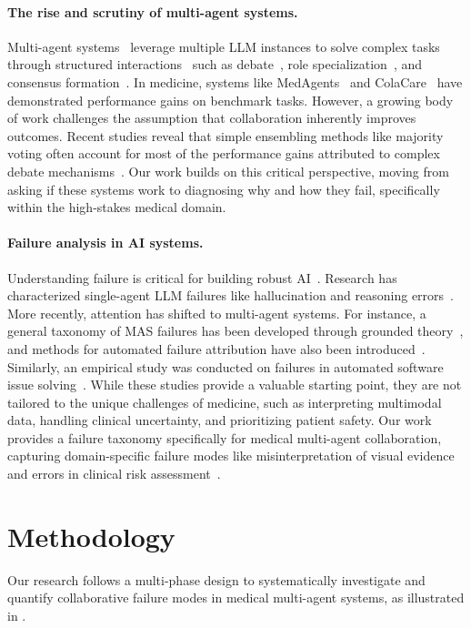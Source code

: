 \documentclass{article}
\begin{document}
\paragraph{The rise and scrutiny of multi-agent systems.}
Multi-agent systems~\cite{kim2024health} leverage multiple LLM instances to solve complex tasks through structured interactions~\cite{tran2025mas_survey} such as debate~\cite{du2023improving,hong2024metagpt}, role specialization~\cite{tang2024medagents}, and consensus formation~\cite{chen2024reconcile}. In medicine, systems like MedAgents~\cite{tang2024medagents} and ColaCare~\cite{wang2025colacare} have demonstrated performance gains on benchmark tasks. However, a growing body of work challenges the assumption that collaboration inherently improves outcomes. Recent studies reveal that simple ensembling methods like majority voting often account for most of the performance gains attributed to complex debate mechanisms~\cite{choi2025debate, kaesberg2025voting, liang2023encouraging}. Our work builds on this critical perspective, moving from asking if these systems work to diagnosing why and how they fail, specifically within the high-stakes medical domain.

\paragraph{Failure analysis in AI systems.}
Understanding failure is critical for building robust AI~\cite{arrieta2020explainable}. Research has characterized single-agent LLM failures like hallucination and reasoning errors~\cite{qiu2025quantifying,huang2025survey}. More recently, attention has shifted to multi-agent systems. For instance, a general taxonomy of MAS failures has been developed through grounded theory~\cite{pan2025multiagent}, and methods for automated failure attribution have also been introduced~\cite{zhang2025which}. Similarly, an empirical study was conducted on failures in automated software issue solving~\cite{liu2025empirical, cemri2025multi}. While these studies provide a valuable starting point, they are not tailored to the unique challenges of medicine, such as interpreting multimodal data, handling clinical uncertainty, and prioritizing patient safety. Our work provides a failure taxonomy specifically for medical multi-agent collaboration, capturing domain-specific failure modes like misinterpretation of visual evidence and errors in clinical risk assessment~\cite{esteva2019guide}.

\section{Methodology}
Our research follows a multi-phase design to systematically investigate and quantify collaborative failure modes in medical multi-agent systems, as illustrated in .
\end{document}
